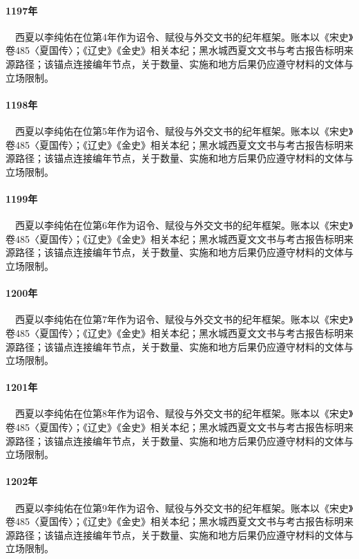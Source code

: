\paragraph{1197年}　西夏以李纯佑在位第4年作为诏令、赋役与外交文书的纪年框架。账本以《宋史》卷485〈夏国传〉；《辽史》《金史》相关本纪；黑水城西夏文文书与考古报告标明来源路径；该锚点连接编年节点，关于数量、实施和地方后果仍应遵守材料的文体与立场限制。

\paragraph{1198年}　西夏以李纯佑在位第5年作为诏令、赋役与外交文书的纪年框架。账本以《宋史》卷485〈夏国传〉；《辽史》《金史》相关本纪；黑水城西夏文文书与考古报告标明来源路径；该锚点连接编年节点，关于数量、实施和地方后果仍应遵守材料的文体与立场限制。

\paragraph{1199年}　西夏以李纯佑在位第6年作为诏令、赋役与外交文书的纪年框架。账本以《宋史》卷485〈夏国传〉；《辽史》《金史》相关本纪；黑水城西夏文文书与考古报告标明来源路径；该锚点连接编年节点，关于数量、实施和地方后果仍应遵守材料的文体与立场限制。

\paragraph{1200年}　西夏以李纯佑在位第7年作为诏令、赋役与外交文书的纪年框架。账本以《宋史》卷485〈夏国传〉；《辽史》《金史》相关本纪；黑水城西夏文文书与考古报告标明来源路径；该锚点连接编年节点，关于数量、实施和地方后果仍应遵守材料的文体与立场限制。

\paragraph{1201年}　西夏以李纯佑在位第8年作为诏令、赋役与外交文书的纪年框架。账本以《宋史》卷485〈夏国传〉；《辽史》《金史》相关本纪；黑水城西夏文文书与考古报告标明来源路径；该锚点连接编年节点，关于数量、实施和地方后果仍应遵守材料的文体与立场限制。

\paragraph{1202年}　西夏以李纯佑在位第9年作为诏令、赋役与外交文书的纪年框架。账本以《宋史》卷485〈夏国传〉；《辽史》《金史》相关本纪；黑水城西夏文文书与考古报告标明来源路径；该锚点连接编年节点，关于数量、实施和地方后果仍应遵守材料的文体与立场限制。

